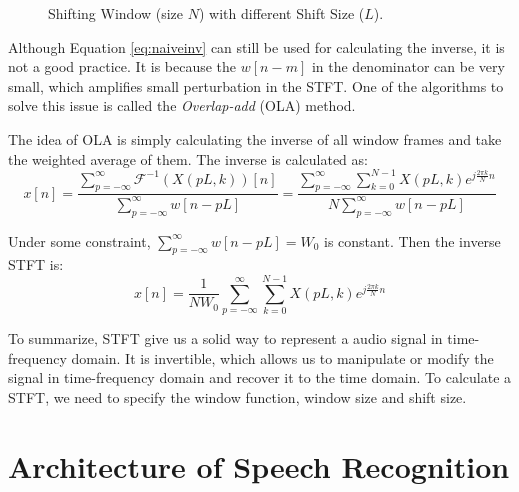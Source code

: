 \documentclass[11pt,a4paper]{report}
\begin{document}
\begin{figure}[thbp]
  \centering
  
  \caption{Shifting Window (size $N$) with different Shift Size ($L$).}
  \label{fig:window}
\end{figure}

Although Equation \ref{eq:naiveinv} can still be used for calculating the inverse, it is not a good practice. It is because the $w[n-m]$ in the denominator can be very small, which amplifies small perturbation in the STFT. One of the algorithms to solve this issue is called the \textit{Overlap-add} (OLA) method.

The idea of OLA is simply calculating the inverse of all window frames and take the weighted average of them. The inverse is calculated as:
\begin{equation}
  x[n] = \frac{\sum_{p=-\infty}^{\infty} \mathcal{F}^{-1}(X(pL,k))[n]}{\sum_{p=-\infty}^{\infty} w[n-pL]}
  = \frac{\sum_{p=-\infty}^{\infty} \sum_{k=0}^{N-1} X(pL,k)e^{j \frac{2\pi k}{N} n}}{N\sum_{p=-\infty}^{\infty} w[n-pL]}
\end{equation}

Under some constraint, $\sum_{p=-\infty}^{\infty} w[n-pL] = W_0$ is constant. Then the inverse STFT is:
\begin{equation}
  x[n] = \frac{1}{NW_0} \sum_{p=-\infty}^{\infty} \sum_{k=0}^{N-1} X(pL,k)e^{j \frac{2\pi k}{N} n} 
  \label{eq:olainv}
\end{equation}

To summarize, STFT give us a solid way to represent a audio signal in time-frequency domain. It is invertible, which allows us to manipulate or modify the signal in time-frequency domain and recover it to the time domain. To calculate a STFT, we need to specify the window function, window size and shift size.

\chapter {Architecture of Speech Recognition}
\label {sec:architecture}
\end{document}

